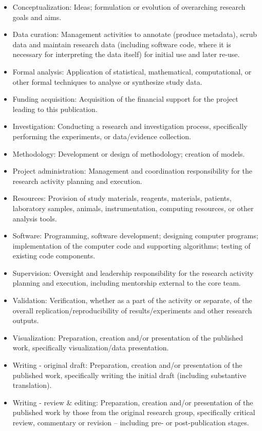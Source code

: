 \documentclass[
  oneside]{book}
\providecommand{\tightlist}{%
  \setlength{\itemsep}{0pt}\setlength{\parskip}{0pt}}
\begin{document}
\begin{itemize}
\tightlist
\item
  Conceptualization: Ideas; formulation or evolution of overarching research goals and aims.
\item
  Data curation: Management activities to annotate (produce metadata), scrub data and maintain research data (including software code, where it is necessary for interpreting the data itself) for initial use and later re-use.
\item
  Formal analysis: Application of statistical, mathematical, computational, or other formal techniques to analyse or synthesize study data.
\item
  Funding acquisition: Acquisition of the financial support for the project leading to this publication.
\item
  Investigation: Conducting a research and investigation process, specifically performing the experiments, or data/evidence collection.
\item
  Methodology: Development or design of methodology; creation of models.
\item
  Project administration: Management and coordination responsibility for the research activity planning and execution.
\item
  Resources: Provision of study materials, reagents, materials, patients, laboratory samples, animals, instrumentation, computing resources, or other analysis tools.
\item
  Software: Programming, software development; designing computer programs; implementation of the computer code and supporting algorithms; testing of existing code components.
\item
  Supervision: Oversight and leadership responsibility for the research activity planning and execution, including mentorship external to the core team.
\item
  Validation: Verification, whether as a part of the activity or separate, of the overall replication/reproducibility of results/experiments and other research outputs.
\item
  Visualization: Preparation, creation and/or presentation of the published work, specifically visualization/data presentation.
\item
  Writing - original draft: Preparation, creation and/or presentation of the published work, specifically writing the initial draft (including substantive translation).
\item
  Writing - review \& editing: Preparation, creation and/or presentation of the published work by those from the original research group, specifically critical review, commentary or revision -- including pre- or post-publication stages.
\end{itemize}
\end{document}
